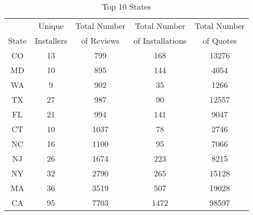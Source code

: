 \begin{table}
\centering
\begin{tabular}{@{}ccccc@{}}
\toprule
 & Unique  & Total Number & Total Number     & Total Number   \\
State    & Installers & of Reviews   & of Installations & of Quotes \\ \midrule  
CO & 13 & 799  & 168  & 13276 \\
MD & 10 & 895  & 144  & 4054  \\
WA & 9  & 902  & 35   & 1266  \\
TX & 27 & 987  & 90   & 12557 \\
FL & 21 & 994  & 141  & 9047  \\
CT & 10 & 1037 & 78   & 2746  \\
NC & 16 & 1100 & 95   & 7066  \\
NJ & 26 & 1674 & 223  & 8215  \\
NY & 32 & 2790 & 265  & 15128 \\
MA & 36 & 3519 & 507  & 19028 \\
CA & 95 & 7703 & 1472 & 98597 \\ \bottomrule
\end{tabular}
\caption{Top 10 States }
\label{summarystats_top10states}
\end{table}
